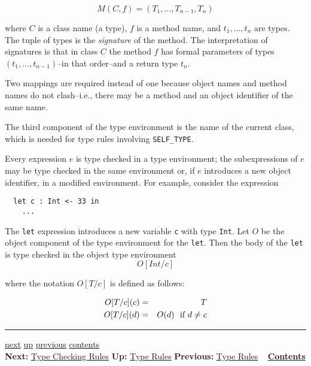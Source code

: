 \documentclass[]{article}
\begin{document}
\begin{displaymath}M(C,f) = (T_1,\ldots,T_{n-1},T_n) \end{displaymath}

where $ C$ is a class name (a type), $f$ is a method name, and
$ t_1,\ldots,t_n$ are types. The tuple of types is the \emph{signature}
of the method. The interpretation of signatures is that in class $ C$
the method $f$ has formal parameters of types
$ (t_1,\ldots,t_{n-1})$--in that order--and a return type $t_n$.

Two mappings are required instead of one because object names and method
names do not clash--i.e., there may be a method and an object identifier
of the same name.

The third component of the type environment is the name of the current
class, which is needed for type rules involving \texttt{SELF\_TYPE}.

Every expression $e$ is type checked in a type environment; the
subexpressions of $e$ may be type checked in the same environment or, if
$e$ introduces a new object identifier, in a modified environment. For
example, consider the expression

\begin{verbatim}
  let c : Int <- 33 in
    ...
\end{verbatim}

The \texttt{let} expression introduces a new variable \texttt{c} with
type \texttt{Int}. Let $O$ be the object component of the type
environment for the \texttt{let}. Then the body of the \texttt{let} is
type checked in the object type environment \\

\begin{displaymath}O[Int/c] \end{displaymath}

where the notation $O[T/c]$ is defined as follows:

\begin{eqnarray*}
O[T/c](c) & = & T \\
O[T/c](d) & = & O(d)\ \ \mbox {\rm if\ }d \neq c
\end{eqnarray*}

\begin{center}\rule{3in}{0.4pt}\end{center}

\href{node43.html}{next} \href{node41.html}{up}
\href{node41.html}{previous} \href{node1.html}{contents} \\
\textbf{Next:} \href{node43.html}{Type Checking Rules} \textbf{Up:}
\href{node41.html}{Type Rules} \textbf{Previous:}
\href{node41.html}{Type Rules} ~ \textbf{\href{node1.html}{Contents}}
\end{document}
